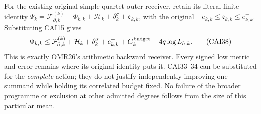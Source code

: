 For the existing original simple-quartet outer receiver, retain its
literal finite identity
$\Psi_k=\mathcal F_{\partial,k}^{(k)}-\Phi_{k,k}
+\mathcal H_k+\delta_k^\sigma+\mathfrak e_{k,k}$, with the original
$-e_{k,k}^-\le\mathfrak e_{k,k}\le e_{k,k}^+$. Substituting CAI15 gives
\[
 \Phi_{k,k}\le\mathcal F_{\partial,k}^{(k)}+\mathcal H_k
       +\delta_k^\sigma+e_{k,k}^++C_k^{\rm budget}-4q\log L_{h,k}.
 \tag{CAI38}
\]
This is exactly OMR26's arithmetic backward receiver. Every signed low
metric and error remains where its original identity puts it. CAI33--34
can be substituted for the \emph{complete} action; they do not justify
independently improving one summand while holding its correlated budget
fixed. No failure of the broader programme or exclusion at other
admitted degrees follows from the size of this particular mean.
